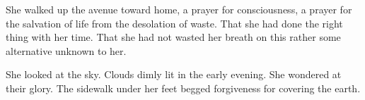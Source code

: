 

She walked up the avenue toward home, a prayer for consciousness, a
prayer for the salvation of life from the desolation of waste.  That
she had done the right thing with her time.  That she had not wasted
her breath on this rather some alternative unknown to her.

She looked at the sky.  Clouds dimly lit in the early evening.  She
wondered at their glory.  The sidewalk under her feet begged
forgiveness for covering the earth.

\bye
